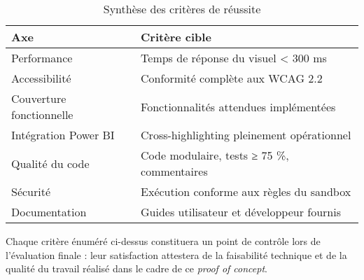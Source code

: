 \begin{table}[H]
    \centering
    \caption{Synthèse des critères de réussite}
    \label{tab:success-criteria}
    \begin{tabularx}{\textwidth}{@{}lX@{}}
        \toprule
        \textbf{Axe} & \textbf{Critère cible} \\
        \midrule
        Performance            & Temps de réponse du visuel < 300 ms \\
        Accessibilité          & Conformité complète aux WCAG 2.2 \\
        Couverture fonctionnelle & Fonctionnalités attendues implémentées \\
        Intégration Power BI   & Cross-highlighting pleinement opérationnel \\
        Qualité du code        & Code modulaire, tests ≥ 75 \%, commentaires \\
        Sécurité               & Exécution conforme aux règles du sandbox \\
        Documentation          & Guides utilisateur et développeur fournis \\
        \bottomrule
    \end{tabularx}
\end{table}

Chaque critère énuméré ci-dessus constituera un point de contrôle lors de
l’évaluation finale : leur satisfaction attestera de la faisabilité technique
et de la qualité du travail réalisé dans le cadre de ce
\textit{proof of concept}.

